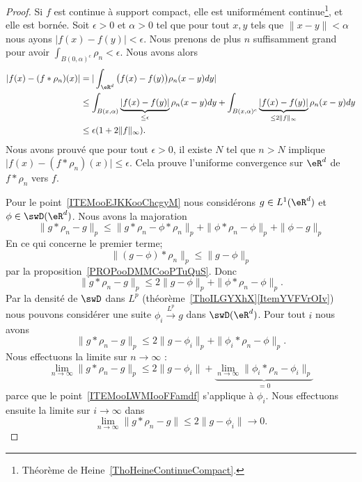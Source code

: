 \begin{proof}
	Si \( f\) est continue à support compact, elle est uniformément continue\footnote{Théorème de Heine~\ref{ThoHeineContinueCompact}.}, et elle est bornée. Soit \( \epsilon>0\) et \( \alpha>0\) tel que pour tout \( x,y\) tels que \( \| x-y \|<\alpha\) nous ayons \( | f(x)-f(y) |<\epsilon\). Nous prenons de plus \(n\) suffisamment grand pour avoir \( \int_{B(0,\alpha)^c}\rho_n<\epsilon\). Nous avons alors
	\begin{subequations}
		\begin{align}
			| f(x)-(f*\rho_n)(x) | & =| \int_{\eR^d}\big( f(x)-f(y) \big)\rho_n(x-y)dy |                                                                                                                 \\
			                       & \leq \int_{B(x,\alpha)}\underbrace{| f(x)-f(y) |}_{\leq \epsilon}\rho_n(x-y)dy+\int_{B(x,\alpha)^c}\underbrace{| f(x)-f(y) |}_{\leq 2\| f \|_{\infty}}\rho_n(x-y)dy \\
			                       & \leq \epsilon(1+2\| f \|_{\infty}).
		\end{align}
	\end{subequations}
	Nous avons prouvé que pour tout \( \epsilon>0\), il existe \( N\) tel que \( n>N\) implique \( \big| f(x)-(f*\rho_n)(x) \big|\leq \epsilon\). Cela prouve l'uniforme convergence sur \( \eR^d\) de \( f*\rho_n\) vers \( f\).

	Pour le point~\ref{ITEMooEJKKooChcgyM} nous considérons \( g\in L^1(\eR^d)\) et \( \phi\in \swD(\eR^d)\). Nous avons la majoration
	\begin{equation}
		\| g*\rho_n-g \|_p\leq \| g*\rho_n-\phi*\rho_n \|_p+\| \phi*\rho_n-\phi \|_p+\| \phi-g \|_p
	\end{equation}
	En ce qui concerne le premier terme;
	\begin{equation}
		\| (g-\phi)*\rho_n \|_p\leq \| g-\phi \|_p
	\end{equation}
	par la proposition~\ref{PROPooDMMCooPTuQuS}. Donc
	\begin{equation}
		\| g*\rho_n-g \|_p\leq 2\| g-\phi \|_p+\| \phi*\rho_n-\phi \|_p.
	\end{equation}
	Par la densité de \( \swD\) dans \( L^p\) (théorème~\ref{ThoILGYXhX}\ref{ItemYVFVrOIv}) nous pouvons considérer une suite \( \phi_i\stackrel{L^p}{\longrightarrow}g\) dans \( \swD(\eR^d)\). Pour tout \( i\) nous avons
	\begin{equation}
		\| g*\rho_n-g \|_p\leq 2\| g-\phi_i \|_p+\| \phi_i*\rho_n-\phi \|_p.
	\end{equation}
	Nous effectuons la limite sur \( n\to \infty\) :
	\begin{equation}
		\lim_{n\to \infty} \| g*\rho_n-g \|_p\leq 2\| g-\phi_i \|+\underbrace{\lim_{n\to \infty} \| \phi_i*\rho_n-\phi_i \|_p}_{=0}
	\end{equation}
	parce que le point~\ref{ITEMooLWMIooFFamdf} s'applique à \( \phi_i\). Nous effectuons ensuite la limite sur \( i\to \infty\) dans
	\begin{equation}
		\lim_{n\to \infty} \| g*\rho_n-g \|\leq 2\| g-\phi_i \|\to 0.
	\end{equation}
\end{proof}

